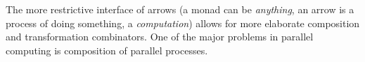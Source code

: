 The more restrictive interface of arrows (a monad can be \emph{anything}, an arrow is a process of doing something, a \emph{computation}) allows for more elaborate composition and transformation combinators. One of the major problems in parallel computing is composition of parallel processes.


